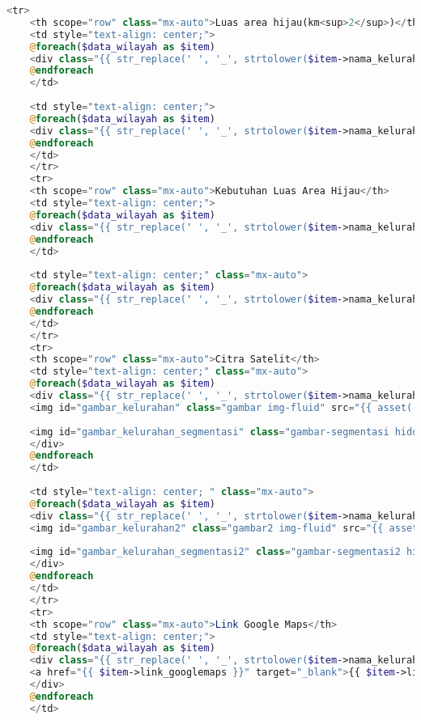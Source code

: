 \begin{lstlisting}[language=PHP, caption=homePage.php]
	<tr>
	<th scope="row" class="mx-auto">Luas area hijau(km<sup>2</sup>)</th>
	<td style="text-align: center;">
	@foreach($data_wilayah as $item)
	<div class="{{ str_replace(' ', '_', strtolower($item->nama_kelurahan)) }} box">{{ $item->luas_rth_kelurahan }}</div>
	@endforeach
	</td>
	
	<td style="text-align: center;">
	@foreach($data_wilayah as $item)
	<div class="{{ str_replace(' ', '_', strtolower($item->nama_kelurahan)) }}2 box2">{{ $item->luas_rth_kelurahan }}</div>
	@endforeach
	</td>
	</tr>
	<tr>
	<th scope="row" class="mx-auto">Kebutuhan Luas Area Hijau</th>
	<td style="text-align: center;">
	@foreach($data_wilayah as $item)
	<div class="{{ str_replace(' ', '_', strtolower($item->nama_kelurahan)) }} box"></div>
	@endforeach
	</td>
	
	<td style="text-align: center;" class="mx-auto">
	@foreach($data_wilayah as $item)
	<div class="{{ str_replace(' ', '_', strtolower($item->nama_kelurahan)) }}2 box2"></div>
	@endforeach
	</td>
	</tr>
	<tr>
	<th scope="row" class="mx-auto">Citra Satelit</th>
	<td style="text-align: center;" class="mx-auto">
	@foreach($data_wilayah as $item)
	<div class="{{ str_replace(' ', '_', strtolower($item->nama_kelurahan)) }} box text-center"> 
	<img id="gambar_kelurahan" class="gambar img-fluid" src="{{ asset('image/!!DATA GAMBAR/' . $item->nama_kelurahan . '.png') }}" width="50%" >
	
	<img id="gambar_kelurahan_segmentasi" class="gambar-segmentasi hidden img-fluid" src="{{ asset('image/!!DATA GAMBAR HASIL/' . $item->nama_kelurahan . '.png') }}" alt="Citra Satelit Segmentasi" width="50%" >
	</div>
	@endforeach
	</td>
	
	<td style="text-align: center; " class="mx-auto"> 
	@foreach($data_wilayah as $item)
	<div class="{{ str_replace(' ', '_', strtolower($item->nama_kelurahan)) }}2 box2 text-center"> 
	<img id="gambar_kelurahan2" class="gambar2 img-fluid" src="{{ asset('image/!!DATA GAMBAR/' . $item->nama_kelurahan . '.png') }}" width="50%">
	
	<img id="gambar_kelurahan_segmentasi2" class="gambar-segmentasi2 hidden img-fluid" src="{{ asset('image/!!DATA GAMBAR HASIL/' . $item->nama_kelurahan . '.png') }}" alt="Citra Satelit Segmentasi" width="50%" >
	</div>
	@endforeach
	</td>
	</tr>
	<tr>
	<th scope="row" class="mx-auto">Link Google Maps</th>
	<td style="text-align: center;">
	@foreach($data_wilayah as $item)
	<div class="{{ str_replace(' ', '_', strtolower($item->nama_kelurahan)) }} box"> 
	<a href="{{ $item->link_googlemaps }}" target="_blank">{{ $item->link_googlemaps }}</a>
	</div>
	@endforeach
	</td>
	

\end{lstlisting}
